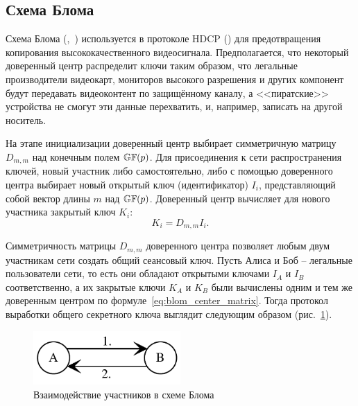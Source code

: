\subsection{Схема Блома}\label{section-bloms-scheme}

Схема Блома (,~\cite{Blom:1984, Blom:1985}) используется в протоколе HDCP () для предотвращения копирования высококачественного видеосигнала. Предполагается, что некоторый доверенный центр распределит ключи таким образом, что легальные производители видеокарт, мониторов высокого разрешения и других компонент будут передавать видеоконтент по защищённому каналу, а <<пиратские>> устройства не смогут эти данные перехватить, и, например, записать на другой носитель.

На этапе инициализации доверенный центр выбирает симметричную матрицу $D_{m,m}$ над конечным полем $\mathbb{GF}(p)$. Для присоединения к сети распространения ключей, новый участник либо самостоятельно, либо с помощью доверенного центра выбирает новый открытый ключ (идентификатор) $I_i$, представляющий собой вектор длины $m$ над $\mathbb{GF}(p)$. Доверенный центр вычисляет для нового участника закрытый ключ $K_i$:
\begin{equation}
	K_i = D_{m,m} I_i.
	\label{eq:blom_center_matrix}
\end{equation}

Симметричность матрицы $D_{m,m}$ доверенного центра позволяет любым двум участникам сети создать общий сеансовый ключ. Пусть Алиса и Боб -- легальные пользователи сети, то есть они обладают открытыми ключами $I_A$ и $I_B$ соответственно, а их закрытые ключи $K_A$ и $K_B$ были вычислены одним и тем же доверенным центром по формуле~\ref{eq:blom_center_matrix}. Тогда протокол выработки общего секретного ключа выглядит следующим образом (рис.~\ref{fig:key_distribution-bloms-scheme}).

\begin{figure}
    \centering
    \includegraphics[width=0.5\textwidth]{pic/key_distribution-bloms-scheme}
    \caption{Взаимодействие участников в схеме Блома\label{fig:key_distribution-bloms-scheme}}
\end{figure}

